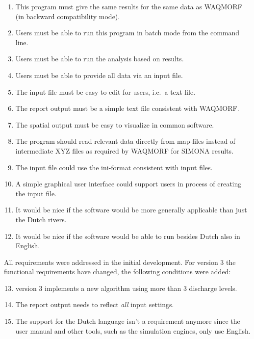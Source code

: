 \begin{enumerate}
\item This program must give the same results for the same data as WAQMORF (in backward compatibility mode).
\item Users must be able to run this program in batch mode from the command line.
\item Users must be able to run the analysis based on \dflowfm results.
\item Users must be able to provide all data via an input file.
\item The input file must be easy to edit for users, i.e.~a text file.
\item The report output must be a simple text file consistent with WAQMORF.
\item The spatial output must be easy to visualize in common software.

\item The program should read relevant data directly from \dflowfm map-files instead of intermediate XYZ files as required by WAQMORF for SIMONA results.

\item The input file could use the ini-format consistent with \dflowfm input files.
\item A simple graphical user interface could support users in process of creating the input file.

\item It would be nice if the software would be more generally applicable than just the Dutch rivers.
\item It would be nice if the software would be able to run besides Dutch also in English.
\end{enumerate}

All requirements were addressed in the initial development.
For \dfastmi version 3 the functional requirements have changed, the following conditions were added:

\begin{enumerate}
\setcounter{enumi}{12} %
\item \dfastmi version 3 implements a new algorithm using more than 3 discharge levels.
\item The report output needs to reflect \emph{all} input settings.
\item The support for the Dutch language isn't a requirement anymore since the user manual and other tools, such as the simulation engines, only use English.
\end{enumerate}


